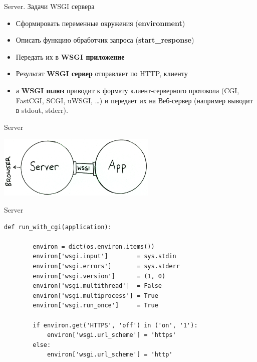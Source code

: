 \begin{frame}{Server. Задачи WSGI сервера}

    \begin{itemize}
        \item Сформировать переменные окружения (\textbf{environment})
        \item Описать функцию обработчик запроса (\textbf{start\_response})
        \item Передать их в \textbf{WSGI приложение}
        \item Результат \textbf{WSGI сервер} отправляет по HTTP, клиенту
        \item а \textbf{WSGI шлюз} приводит к формату клиент-серверного
            протокола (CGI, FastCGI, SCGI, uWSGI, \ldots) и передает их на
            Веб-сервер (например выводит в stdout, stderr).
    \end{itemize}

\end{frame}

\begin{frame}{Server}

    \begin{center}
        \vspace{-0.35in}\includegraphics[width=3in]{media/server-app.png}
    \end{center}

\end{frame}

\begin{frame}[fragile]{Server}

    \begin{lstlisting}[style=python]
    def run_with_cgi(application):

        environ = dict(os.environ.items())
        environ['wsgi.input']        = sys.stdin
        environ['wsgi.errors']       = sys.stderr
        environ['wsgi.version']      = (1, 0)
        environ['wsgi.multithread']  = False
        environ['wsgi.multiprocess'] = True
        environ['wsgi.run_once']     = True

        if environ.get('HTTPS', 'off') in ('on', '1'):
            environ['wsgi.url_scheme'] = 'https'
        else:
            environ['wsgi.url_scheme'] = 'http'
    \end{lstlisting}

\end{frame}

